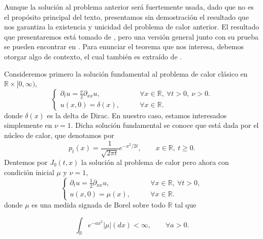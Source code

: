 \documentclass[letterpaper,twoside,12pt]{book}
\newcommand{\R}{\mathbb{R}}
\newcommand{\1}{\mathds{1}}
\theoremstyle{definition}
\theoremstyle{definition}
\theoremstyle{remark}
\theoremstyle{definition}
\theoremstyle{definition}
\theoremstyle{definition}
\theoremstyle{definition}
\theoremstyle{definition}
\begin{document}
Aunque la solución al problema anterior será fuertemente usada, dado que no es el propósito principal del texto, presentamos sin demostración el resultado que nos garantiza la existencia y unicidad del problema de calor anterior. El resultado que presentaremos está tomado de \cite[proposición 2.1]{KUZGUN202268}, pero una versión general junto con su prueba se pueden encontrar en \cite[teorema 2.4]{ChenDalang2014}. Para enunciar el teorema que nos interesa, debemos otorgar algo de contexto, el cual también es extraído de \cite{ChenDalang2014}.

Consideremos primero la solución fundamental al problema de calor clásico en $\R\times [0,\infty)$,
\begin{equation*}
   \begin{cases}
      \partial_t u=\frac{\nu}{2}\partial_{xx}u, & \qquad \forall x\in \R, \ \forall t>0, \ \nu>0.\\
      u(x,0)=\delta(x), & \qquad \forall x\in \R.
   \end{cases}
\end{equation*}
donde $\delta(x)$ es la delta de Dirac. En nuestro caso, estamos interesados simplemente en $\nu=1$. Dicha solución fundamental se conoce que está dada por el núcleo de calor, que denotamos por 
\[
p_t(x)=\frac{1}{\sqrt{2\pi t}}e^{-x^2/2 t}, \qquad x\in \R, \ t\geq0.
\]
Dentemos por $J_{0}(t,x)$ la solución al problema de calor pero ahora con condición inicial $\mu$ y $\nu=1$, 
\begin{equation*}
   \begin{cases}
      \partial_t u=\frac{1}{2}\partial_{xx}u, & \qquad \forall x\in \R, \ \forall t>0,\\
      u(x,0)=\mu(x), & \qquad \forall x\in \R.
   \end{cases}
\end{equation*}
donde $\mu$ es una medida signada de Borel sobre todo $\R$ tal que 

   \begin{equation}\label{medidasignadaborel}
      \int_{\R}e^{-ax^2}|\mu|(dx)<\infty, \qquad \forall a>0.
   \end{equation}
\end{document}
